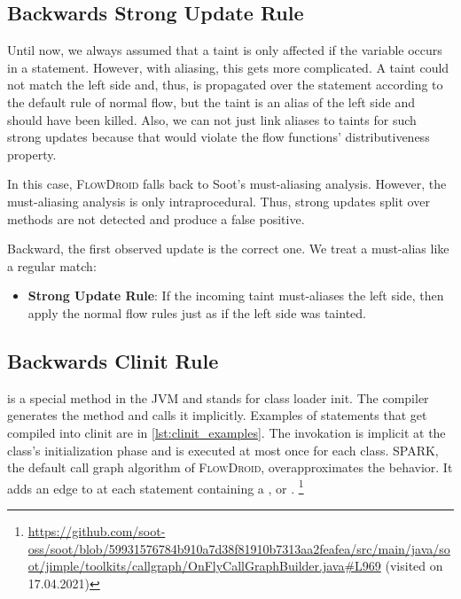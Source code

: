 \documentclass[../draft.tex]{subfiles}
\begin{document}
    \subsection{Backwards Strong Update Rule}
    Until now, we always assumed that a taint is only affected if the variable occurs in a statement. 
    However, with aliasing, this gets more complicated. 
    A taint could not match the left side and, thus, is propagated over the statement according to the default rule of normal flow, but the taint is an alias of the left side and should have been killed. 
    Also, we can not just link aliases to taints for such strong updates because that would violate the flow functions' distributiveness property.
    
    In this case, \textsc{FlowDroid} falls back to Soot's must-aliasing analysis. However, the must-aliasing analysis is only intraprocedural. Thus, strong updates split over methods are not detected and produce a false positive.
    
    Backward, the first observed update is the correct one. We treat a must-alias like a regular match:
    \begin{itemize}
        \item \textbf{Strong Update Rule}: If the incoming taint must-aliases the left side, then apply the normal flow rules just as if the left side was tainted. 
    \end{itemize}

    \subsection{Backwards Clinit Rule}\label{s:clinitrule}
     is a special method in the JVM and stands for class loader init. 
    The compiler generates the method and calls it implicitly. Examples of statements that get compiled into clinit are in \autoref{lst:clinit_examples}. 
    The invokation is implicit at the class's initialization phase and is executed at most once for each class\footnotemark{}.
    SPARK, the default call graph algorithm of \textsc{FlowDroid}, overapproximates the  behavior. 
    It adds an edge to  at each statement containing a ,  or \footnotemark{}.
    \footnote{\url{https://github.com/soot-oss/soot/blob/59931576784b910a7d38f81910b7313aa2feafea/src/main/java/soot/jimple/toolkits/callgraph/OnFlyCallGraphBuilder.java\#L969} (visited on 17.04.2021)}
   
\end{document}
